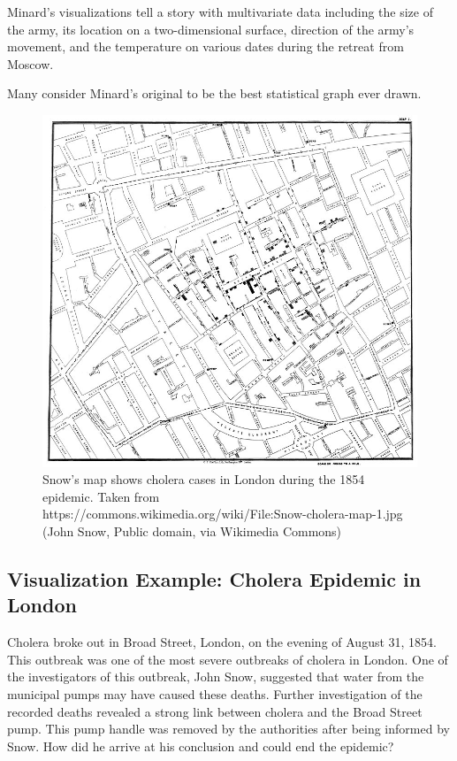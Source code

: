 \documentclass[
]{book}
\begin{document}
Minard's visualizations tell a story with multivariate data including the size of the army, its location on a two-dimensional surface, direction of the army's movement, and the temperature on various dates during the retreat from Moscow.

Many consider Minard's original to be the best statistical graph ever drawn.

\begin{figure}

{\centering \includegraphics[width=0.75\linewidth]{images/snow-cholera-map} 

}

\caption{Snow's map shows cholera cases in London during the 1854 epidemic. Taken from https://commons.wikimedia.org/wiki/File:Snow-cholera-map-1.jpg (John Snow, Public domain, via Wikimedia Commons)}\label{fig:unnamed-chunk-2}
\end{figure}

\hypertarget{visualization-example-cholera-epidemic-in-london}{%
\subsection{Visualization Example: Cholera Epidemic in London}\label{visualization-example-cholera-epidemic-in-london}}

Cholera broke out in Broad Street, London, on the evening of August 31, 1854. This outbreak was one of the most severe outbreaks of cholera in London. One of the investigators of this outbreak, John Snow, suggested that water from the municipal pumps may have caused these deaths. Further investigation of the recorded deaths revealed a strong link between cholera and the Broad Street pump. This pump handle was removed by the authorities after being informed by Snow. How did he arrive at his conclusion and could end the epidemic?
\end{document}
